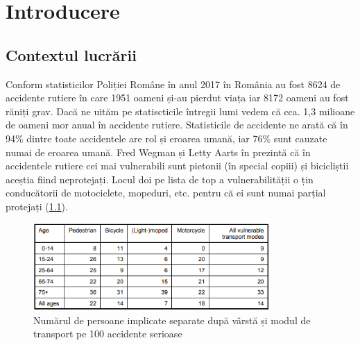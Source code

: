 
\chapter{Introducere}
\label{cap:Introducere}
 \section{Contextul lucrării}
Conform statisticilor Poliției Române \cite{politia_romana}  în anul 2017 în România au fost 8624 de accidente rutiere în care 1951 oameni și-au pierdut viața iar 8172 oameni au fost răniți grav. Dacă ne uităm pe statiscticile întregii lumi \cite{WHO}  vedem că cca. 1,3 milioane de oameni mor anual în accidente rutiere.\newline
Statisticile de accidente ne arată că  în 94\% dintre toate accidentele are rol și eroarea umană, iar 76\% sunt cauzate numai de eroarea umană.
 Fred Wegman și Letty Aarts  în \cite{SWOV} prezintă că în accidentele rutiere cei mai vulnerabili sunt pietonii (în special copiii) și bicicliștii aceștia fiind neprotejați. Locul doi pe lista de top a vulnerabilității o țin conducătorii de motociclete, mopeduri, etc. pentru că ei sunt numai parțial protejați (\ref{fig:lethalities}).\newline

\begin{figure}[h!]
    	\centering
	\captionsetup{justification=centering, margin=2cm}
	\includegraphics[width=0.8\textwidth]{figures/lethality_rates.png}
	\caption{Numărul de persoane implicate separate după vârstă și modul de transport pe 100 accidente serioase \cite{SWOV}}
	\label{fig:lethalities}
\end{figure}

